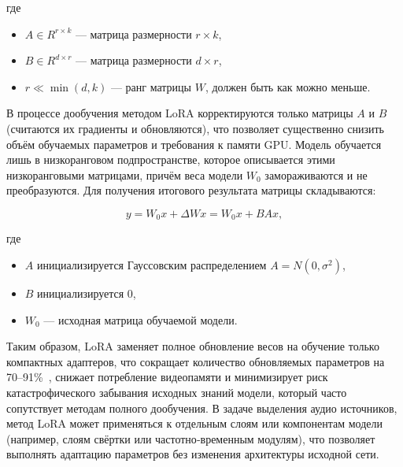 \documentclass[14pt]{extarticle}
\begin{document}
где 
\begin{itemize}[label=$\bullet$, wide]
	\item $A \in R^{r \times k}$ --- матрица размерности ${r \times k}$,
	\item $B \in R^{d \times r}$ --- матрица размерности ${d \times r}$,
	\item $r \ll \min(d, k)$ --- ранг матрицы $W$, должен быть как можно меньше.
\end{itemize}

В процессе дообучения методом LoRA корректируются только матрицы $A$ и $B$ (считаются их градиенты и обновляются), 
что позволяет существенно снизить объём обучаемых параметров и требования к памяти GPU. Модель обучается лишь в низкоранговом 
подпространстве, которое описывается этими низкоранговыми матрицами, причём веса модели 
$W_0$ замораживаются и не преобразуются. Для получения итогового результата матрицы складываются:

\begin{equation}
    y = W_0x + \Delta Wx = W_0x + BAx,
\end{equation}

где 
\begin{itemize}[label=$\bullet$, wide]
	\item $A$ инициализируется Гауссовским распределением $A = N(0, \sigma^2)$,
	\item $B$ инициализируется 0,
	\item $W_0$ --- исходная матрица обучаемой модели.
\end{itemize}

Таким образом, LoRA заменяет полное обновление весов на обучение только компактных адаптеров, что сокращает 
количество обновляемых параметров на 70–91\%~\cite{LoRA}, снижает потребление видеопамяти и минимизирует риск катастрофического 
забывания исходных знаний модели, который часто сопутствует методам полного дообучения. В задаче выделения аудио источников, 
метод LoRA может применяться к отдельным слоям или компонентам модели (например, слоям свёртки или частотно‑временным модулям), 
что позволяет выполнять адаптацию параметров без изменения архитектуры исходной сети.
\end{document}
